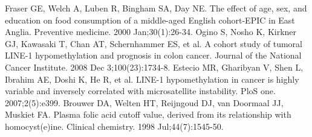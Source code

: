 \begin{thebibliography}{12}
		Fraser GE, Welch A, Luben R, Bingham SA, Day NE. The effect of age, sex, and education on food consumption of a middle-aged English cohort-EPIC in East Anglia. Preventive medicine. 2000 Jan;30(1):26-34. 
		Ogino S, Nosho K, Kirkner GJ, Kawasaki T, Chan AT, Schernhammer ES, et al. A cohort study of tumoral LINE-1 hypomethylation and prognosis in colon cancer. Journal of the National Cancer Institute. 2008 Dec 3;100(23):1734-8. 
		Estecio MR, Gharibyan V, Shen L, Ibrahim AE, Doshi K, He R, et al. LINE-1 hypomethylation in cancer is highly variable and inversely correlated with microsatellite instability. PloS one. 2007;2(5):e399. 
		Brouwer DA, Welten HT, Reijngoud DJ, van Doormaal JJ, Muskiet FA. Plasma folic acid cutoff value, derived from its relationship with homocyst(e)ine. Clinical chemistry. 1998 Jul;44(7):1545-50. 
\end{thebibliography} 
